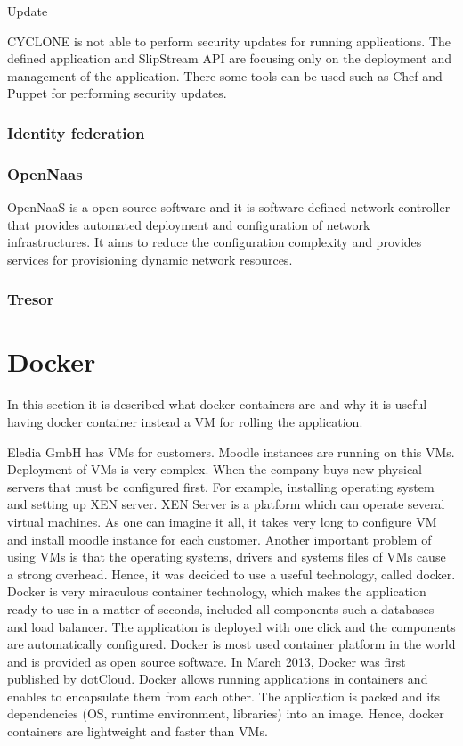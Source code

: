 Update

CYCLONE is not able to perform security updates for running applications. The defined application and SlipStream API are focusing only on the deployment and management of the application. There some tools can be used such as Chef and Puppet for performing security updates.

\subsubsection{Identity federation}

\subsubsection{OpenNaas}
OpenNaaS is a open source software and it is software-defined network controller that provides automated deployment and configuration of network infrastructures.  It aims to reduce the configuration complexity and provides services for provisioning dynamic network resources.
\subsubsection{Tresor}

\section{Docker}
In this section it is described what docker containers are and why it is useful having docker container instead a VM for rolling the application. 

Eledia GmbH has VMs for customers. Moodle instances are running on this VMs. Deployment of VMs is very complex. When the company buys new physical servers that must be configured first. For example, installing operating system and setting up XEN server. XEN Server is a platform which can operate several virtual machines. As one can imagine it all, it takes very long to configure VM and install moodle instance for each customer. Another important problem of using VMs is that the operating systems, drivers and systems files of VMs cause a strong overhead. Hence, it was decided to use a useful technology, called docker. Docker is very miraculous container technology, which makes the application ready to use in a matter of seconds, included all components such a databases and load balancer. The application is deployed with one click and the components are automatically configured. Docker is most used container platform in the world and is provided as open source software. In March 2013, Docker was first published by dotCloud. Docker allows running applications in containers and enables to encapsulate them from each other. The application is packed and its dependencies (OS, runtime environment, libraries) into an image. Hence, docker containers are lightweight and faster than VMs. 


